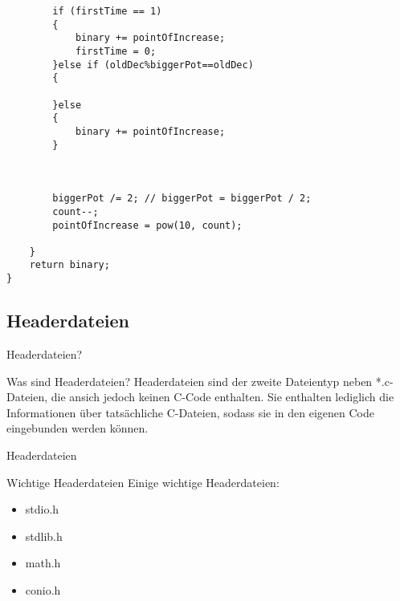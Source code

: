 \documentclass[usenames,dvipsnames,10pt]{beamer}
\begin{document}
    \begin{frame}[fragile]
        \begin{lstlisting}
        if (firstTime == 1)
        {
            binary += pointOfIncrease;
            firstTime = 0;
        }else if (oldDec%biggerPot==oldDec)
        {
            
        }else
        {
            binary += pointOfIncrease;
        }
        
        
        
        biggerPot /= 2; // biggerPot = biggerPot / 2;
        count--;
        pointOfIncrease = pow(10, count);
        
    }
    return binary;
}
        \end{lstlisting}
    \end{frame}
    \subsection{Headerdateien}
    \begin{frame}{Headerdateien?}
        \begin{block}{Was sind Headerdateien?}
            Headerdateien sind der zweite Dateientyp neben *.c-Dateien, die ansich
            jedoch keinen C-Code enthalten. Sie enthalten lediglich die Informationen über tatsächliche
            C-Dateien, sodass sie in den eigenen Code eingebunden werden können.
        \end{block}
    \end{frame}

    \begin{frame}{Headerdateien}
        \begin{block}{Wichtige Headerdateien}
            Einige wichtige Headerdateien:
            \begin{itemize}
                \item stdio.h
                \item stdlib.h
                \item math.h
                \item conio.h
            \end{itemize}
        \end{block}
    \end{frame}
\end{document}
